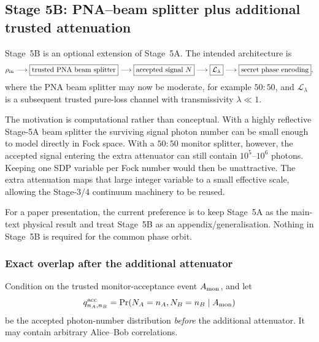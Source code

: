 \documentclass[11pt]{article}
\theoremstyle{remark}
\begin{document}
\subsection{Stage 5B: PNA--beam splitter plus additional trusted attenuation}
\label{sec:stage5b}

Stage~5B is an optional extension of Stage~5A.  The intended architecture is
\begin{equation}
    \rho_{\rm in}
    \longrightarrow
    \boxed{\text{trusted PNA beam splitter}}
    \longrightarrow
    \boxed{\text{accepted signal }N}
    \longrightarrow
    \boxed{\mathcal L_{\lambda}}
    \longrightarrow
    \boxed{\text{secret phase encoding}},
    \label{eq:stage5b-architecture}
\end{equation}
where the PNA beam splitter may now be moderate, for example \(50{:}50\), and
\(\mathcal L_\lambda\) is a subsequent trusted pure-loss channel with
transmissivity \(\lambda\ll1\).

The motivation is computational rather than conceptual.  With a highly
reflective Stage-5A beam splitter the surviving signal photon number can be
small enough to model directly in Fock space.  With a \(50{:}50\) monitor
splitter, however, the accepted signal entering the extra attenuator can still
contain \(10^5\)--\(10^6\) photons.  Keeping one SDP variable per Fock number
would then be unattractive.  The extra attenuation maps that large integer
variable to a small effective scale, allowing the Stage-3/4 continuum
machinery to be reused.

For a paper presentation, the current preference is to keep Stage~5A as the
main-text physical result and treat Stage~5B as an appendix/generalisation.
Nothing in Stage~5B is required for the common phase orbit.

\subsubsection{Exact overlap after the additional attenuator}

Condition on the trusted monitor-acceptance event \(A_{\rm mon}\), and let
\[
    q^{\rm acc}_{n_A,n_B}
    =
    \Pr(
      N_A=n_A,N_B=n_B
      \mid A_{\rm mon}
    )
\]
be the accepted photon-number distribution \emph{before} the additional
attenuator.  It may contain arbitrary Alice--Bob correlations.
\end{document}
